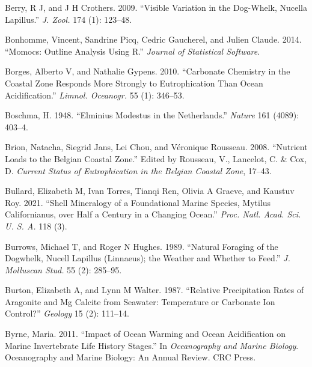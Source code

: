 \documentclass[smallextended]{svjour3}       %
\newlength{\cslhangindent}
\newenvironment{CSLReferences}[2] %
 {%
  \setlength{\parindent}{0pt}
  \ifodd #1 \everypar{\setlength{\hangindent}{\cslhangindent}}\ignorespaces\fi
  \ifnum #2 > 0
  \setlength{\parskip}{#2\baselineskip}
  \fi
 }%
 {}
\begin{document}
\begin{CSLReferences}{1}{0}
\leavevmode{}%
Berry, R J, and J H Crothers. 2009. {``Visible Variation in the
Dog-Whelk, Nucella Lapillus.''} \emph{J. Zool.} 174 (1): 123--48.

\leavevmode{}%
Bonhomme, Vincent, Sandrine Picq, Cedric Gaucherel, and Julien Claude.
2014. {``Momocs: Outline Analysis Using {R}.''} \emph{Journal of
Statistical Software}.

\leavevmode{}%
Borges, Alberto V, and Nathalie Gypens. 2010. {``Carbonate Chemistry in
the Coastal Zone Responds More Strongly to Eutrophication Than Ocean
Acidification.''} \emph{Limnol. Oceanogr.} 55 (1): 346--53.

\leavevmode{}%
Boschma, H. 1948. {``Elminius Modestus in the Netherlands.''}
\emph{Nature} 161 (4089): 403--4.

\leavevmode{}%
Brion, Natacha, Siegrid Jans, Lei Chou, and Véronique Rousseau. 2008.
{``Nutrient Loads to the Belgian Coastal Zone.''} Edited by Rousseau,
V., Lancelot, C. \& Cox, D. \emph{Current Status of Eutrophication in
the Belgian Coastal Zone}, 17--43.

\leavevmode{}%
Bullard, Elizabeth M, Ivan Torres, Tianqi Ren, Olivia A Graeve, and
Kaustuv Roy. 2021. {``Shell Mineralogy of a Foundational Marine Species,
Mytilus Californianus, over Half a Century in a Changing Ocean.''}
\emph{Proc. Natl. Acad. Sci. U. S. A.} 118 (3).

\leavevmode{}%
Burrows, Michael T, and Roger N Hughes. 1989. {``Natural Foraging of the
Dogwhelk, Nucell Lapillus (Linnaeus); the Weather and Whether to
Feed.''} \emph{J. Molluscan Stud.} 55 (2): 285--95.

\leavevmode{}%
Burton, Elizabeth A, and Lynn M Walter. 1987. {``Relative Precipitation
Rates of Aragonite and Mg Calcite from Seawater: Temperature or
Carbonate Ion Control?''} \emph{Geology} 15 (2): 111--14.

\leavevmode{}%
Byrne, Maria. 2011. {``Impact of Ocean Warming and Ocean Acidification
on Marine Invertebrate Life History Stages.''} In \emph{Oceanography and
Marine Biology}. Oceanography and Marine Biology: An Annual Review. CRC
Press.


\end{CSLReferences}
\end{document}
